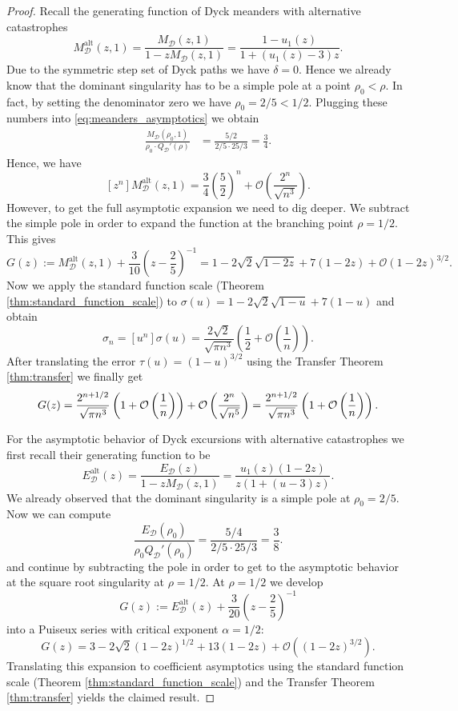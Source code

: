 \begin{proof}
  Recall the generating function of Dyck meanders with alternative catastrophes
  $$
  M_\mathcal{D}^\mathrm{alt}(z,1) = \frac{M_\mathcal{D}(z,1)}{1 - zM_\mathcal{D}(z,1)} = \frac{1-u_1(z)}{1 + (u_1(z) - 3)z}. 
  $$
  Due to the symmetric step set of Dyck paths we have $\delta = 0$. Hence we already know that the dominant singularity has to be a simple pole at a point $\rho_0 < \rho$. In fact, by setting the denominator zero we have $\rho_0 = 2/5 < 1/2$. Plugging these numbers into \eqref{eq:meanders_asymptotics} we obtain
  \begin{align*}
    \frac{M_\mathcal{D}(\rho_0,1)}{\rho_0 \cdot Q_\mathcal{D}'(\rho)} &= \frac{5/2}{2/5 \cdot 25/3} = \frac{3}{4}.
  \end{align*}
  Hence, we have
  $$
  [z^{n}]M_\mathcal{D}^\mathrm{alt}(z,1) = \frac{3}{4}\left(\frac{5}{2}\right)^n + \mathcal{O}\left(\frac{2^n}{\sqrt{n^3}}\right).
  $$
  However, to get the full asymptotic expansion we need to dig deeper.
  We subtract the simple pole in order to expand the function at the branching point $\rho = 1/2$. This gives 
  $$
  G(z) := M_\mathcal{D}^\mathrm{alt}(z,1) + \frac{3}{10} \left(z -\frac{2}{5}\right)^{-1} = 1 -2\sqrt{2}\sqrt{1-2z} + 7\left(1-2z\right) + \mathcal{O}\left(1-2z\right)^{3/2}.
  $$
  Now we apply the standard function scale (Theorem \ref{thm:standard_function_scale}) to $\sigma(u) = 1-2\sqrt{2}\sqrt{1-u} + 7(1-u)$ and obtain 
  $$
    \sigma_{n} = [u^{n}]\sigma(u) = \frac{2\sqrt{2}}{\sqrt{\pi n^{3}}}\left(\frac{1}{2} + \mathcal{O}\left(\frac{1}{n}\right)\right).
  $$
  After translating the error $\tau(u) = (1-u)^{3/2}$ using the Transfer Theorem \ref{thm:transfer} we finally get
  \begin{equation*}
    [z^{n}]G(z) = \frac{2^{n+1/2}}{\sqrt{\pi n^{3}}}\left(1 + \mathcal{O}\left(\frac{1}{n}\right)\right) + \mathcal{O}\left(\frac{2^{n}}{\sqrt{n^{5}}}\right)
    = \frac{2^{n+1/2}}{\sqrt{\pi n^{3}}}\left(1 + \mathcal{O}\left(\frac{1}{n}\right)\right). \qedhere
  \end{equation*}

  For the asymptotic behavior of Dyck excursions with alternative catastrophes we first recall their generating function to be
  $$
  E_\mathcal{D}^\mathrm{alt}(z) = \frac{E_\mathcal{D}(z)}{1 - zM_\mathcal{D}(z,1)} = \frac{u_1(z)(1 - 2z)}{z(1 + (u - 3)z)}. 
  $$
  We already observed that the dominant singularity is a simple pole at $\rho_0 = 2/5$. Now we can compute
  $$
  \frac{E_\mathcal{D}(\rho_0)}{\rho_0 Q_\mathcal{D}'(\rho_0)} = \frac{5/4}{2/5 \cdot 25/3} = \frac{3}{8}.
  $$
  and continue by subtracting the pole in order to get to the asymptotic behavior at the square root singularity at $\rho = 1/2$.
  At $\rho = 1/2$ we develop 
  $$
    G(z) := E_\mathcal{D}^\mathrm{alt}(z) + \frac{3}{20} \left(z -\frac{2}{5}\right)^{-1}
  $$
  into a Puiseux series with critical exponent $\alpha = 1/2$: 
  $$
    G(z) = 3 - 2\sqrt{2}(1-2z)^{1/2}  + 13(1-2z) + \mathcal{O}((1-2z)^{3/2}).
  $$
  Translating this expansion to coefficient asymptotics using the standard function scale (Theorem \ref{thm:standard_function_scale}) and the Transfer Theorem \ref{thm:transfer} yields the claimed result.
\end{proof}

